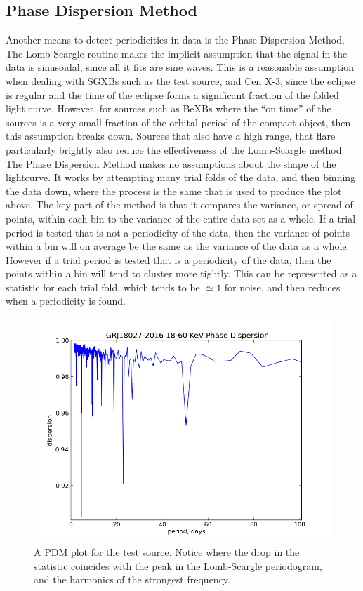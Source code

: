\subsection{Phase Dispersion Method}
Another means to detect periodicities in data is the Phase Dispersion Method. The Lomb-Scargle routine makes the implicit assumption that the signal in the data is sinusoidal, since all it fits are sine waves. This is a reasonable assumption when dealing with SGXBs such as the test source, and Cen X-3, since the eclipse is regular and the time of the eclipse forms a significant fraction of the folded light curve.  However, for sources such as BeXBs where the \textquotedblleft{}on time\textquotedblright{} of the sources is a very small fraction of the orbital period of the compact object, then this assumption breaks down. Sources that also have a high range, that flare particularly brightly also reduce the effectiveness of the Lomb-Scargle method. 
The Phase Dispersion Method makes no assumptions about the shape of the lightcurve. It works by attempting many trial folds of the data, and then binning the data down, where the process is the same that is used to produce the plot above. The key part of the method is that it compares the variance, or spread of points, within each bin to the variance of the entire data set as a whole. If a trial period is tested that is not a periodicity of the data, then the variance of points within a bin will on average be the same as the variance of the data as a whole. However if a trial period is tested that is a periodicity of the data, then the points within a bin will tend to cluster more tightly. This can be represented as a statistic for each trial fold, which tends to be $\simeq1$ for noise, and then reduces when a periodicity is found.

\begin{figure}[h!]
\centering
\includegraphics[width=130mm]{gfx/Fig6.png}
\caption{A PDM plot for the test source. Notice where the drop in the statistic coincides with the peak in the Lomb-Scargle periodogram, and the harmonics of the strongest frequency.}
\label{Figure 6}
\end{figure}

